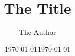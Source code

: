 \documentclass[b5paper,twoside]{scrbook}
\begin{document}
    \newcommand{\term}[1]{\emph{#1}}

    \frontmatter
        \title{The Title}
        \author{The Author}

        \date{\small\today}
        \maketitle
        \date{\today}


        \cleardoublepage
        \tableofcontents

    \mainmatter
        \begin{onehalfspacing}

        
        

        \end{onehalfspacing}

        \appendix
        

    \backmatter
        \printbibliography[heading=bibintoc]
\end{document}
